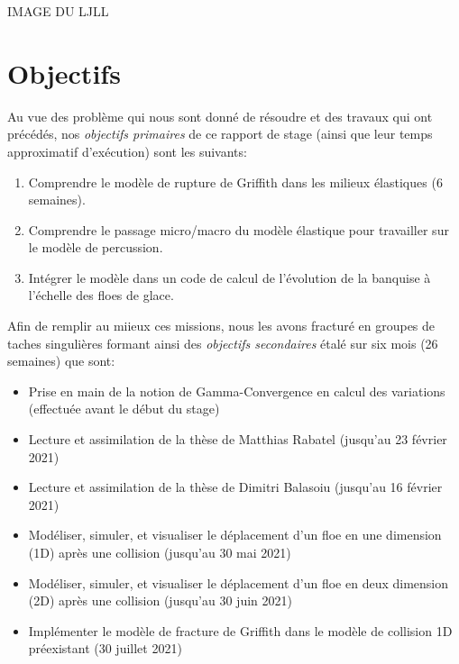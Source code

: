 IMAGE DU LJLL







\section{Objectifs}


Au vue des problème qui nous sont donné de résoudre et des travaux qui ont précédés, nos \emph{objectifs primaires} de ce rapport de stage (ainsi que leur temps approximatif d'exécution) sont les suivants:
\begin{enumerate}
    \item Comprendre le modèle de rupture de Griffith dans les milieux élastiques (6 semaines).
    \item Comprendre le passage micro/macro du modèle élastique pour travailler sur le modèle de percussion. 
    \item Intégrer le modèle dans un code de calcul de l’évolution
    de la banquise à l’échelle des floes de glace.
\end{enumerate}

Afin de remplir au miieux ces missions, nous les avons fracturé en groupes de taches singulières formant ainsi des \emph{objectifs secondaires} étalé sur six mois (26 semaines) que sont:   

\begin{itemize}
    \item Prise en main de la notion de Gamma-Convergence en calcul des variations (effectuée avant le début du stage)
    \item Lecture et assimilation de la thèse de Matthias Rabatel (jusqu'au 23 février 2021)
    \item Lecture et assimilation de la thèse de Dimitri Balasoiu (jusqu'au 16 février 2021)
    \item Modéliser, simuler, et visualiser le déplacement d'un floe en une dimension (1D) après une collision (jusqu'au 30 mai 2021)
    \item Modéliser, simuler, et visualiser le déplacement d'un floe en deux dimension (2D) après une collision (jusqu'au 30 juin 2021)
    \item Implémenter le modèle de fracture de Griffith dans le modèle de collision 1D préexistant (30 juillet 2021)
\end{itemize}




